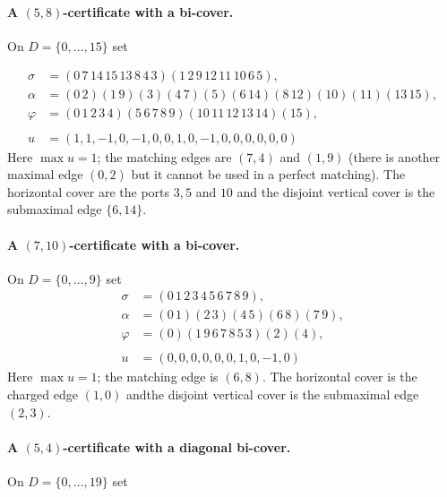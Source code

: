 \documentclass[11pt]{article}
\theoremstyle{remark}
\begin{document}
\paragraph{A $(5,8)$-certificate with a bi-cover.} On $D=\{0,\dots,15\}$ set

\begin{equation}
\begin{aligned}
\sigma&=(0\,7\,14\,15\,13\,8\,4\,3)(1\,2\,9\,12\,11\,10\,6\,5),\\[2pt]
\alpha&=(0\,2)(1\,9)(3)(4\,7)(5)(6\,14)(8\,12)(10)(11)(13\,15),\\[2pt]
\varphi&=(0\,1\,2\,3\,4)(5\,6\,7\,8\,9)(10\,11\,12\,13\,14)(15),\\ \\[2pt]
u&=(1,1,-1,0,-1,0,0,1,0,-1,0,0,0,0,0,0)
\end{aligned}
\label{eq:C58}
\end{equation}
Here $\max u=1$; the matching edges are $(7,4)$ and $(1,9)$ (there is another maximal edge $(0,2)$ but it cannot be used in a perfect matching). The horizontal cover are the ports $3,5$ and $10$ and the disjoint vertical cover is the submaximal edge $\{6,14\}$. 

\paragraph{A $(7,10)$-certificate with a bi-cover.} On  $D=\{0,\dots,9\}$ set
\begin{equation}
\begin{aligned}
\sigma&=(0\,1\,2\,3\,4\,5\,6\,7\,8\,9),\\[2pt]
\alpha&=(0\,1)(2\,3)(4\,5)(6\,8)(7\,9),\\[2pt]
\varphi&=(0)(1\,9\,6\,7\,8\,5\,3)(2)(4) ,\\ \\[2pt]
u&=(0,0,0,0,0,0,1,0,-1,0)
\end{aligned}
\label{eq:C710}
\end{equation}
Here $\max u=1$; the matching edge is $(6,8)$. The horizontal cover is the charged edge $(1,0)$ andthe disjoint vertical cover is the submaximal edge $(2,3)$. 

\paragraph{A $(5,4)$-certificate with a diagonal bi-cover.}
On $D=\{0,\dots,19\}$ set
\end{document}
